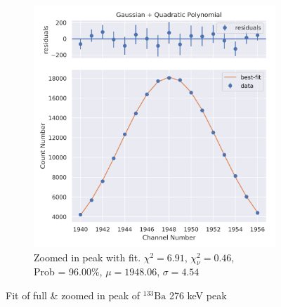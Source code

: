 \documentclass[11pt,a4paper]{article}
\newcommand{\element}[2]{$^{#2}\textrm{#1}$}
\begin{document}
\begin{figure}[H]
\begin{subfigure}{.5\linewidth}
    \includegraphics[width=\linewidth]{./Images/Barium133/Quad/Quad_4_Zoom.png}
    \caption{Zoomed in peak with fit. $\chi^2 = 6.91$, $\chi^2_\nu = 0.46$, \\ Prob = 96.00\%, $\mu = 1948.06$, $\sigma = 4.54$}
  \end{subfigure}
  \caption{Fit of full \& zoomed in peak of \element{Ba}{133} 276 keV peak}
\end{figure}
\end{document}
